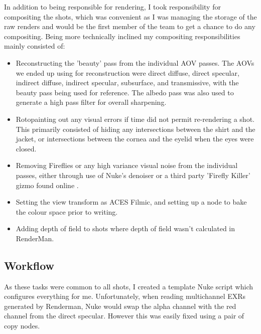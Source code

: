 \documentclass[11pt]{article}
\begin{document}
In addition to being responsible for rendering, I took responsibility for compositing the shots, which was convenient as I was managing the storage of the raw renders and would be the first member of the team to get a chance to do any compositing. Being more technically inclined my compositing responsibilities mainly consisted of:

\begin{itemize}

\item Reconstructing the 'beauty' pass from the individual AOV passes. The AOVs we ended up using for reconstruction were direct diffuse, direct specular, indirect diffuse, indirect specular, subsurface, and transmissive, with the beauty pass being used for reference. The albedo pass was also used to generate a high pass filter for overall sharpening.

\item Rotopainting out any visual errors if time did not permit re-rendering a shot. This primarily consisted of hiding any intersections between the shirt and the jacket, or intersections between the cornea and the eyelid when the eyes were closed.

\item Removing Fireflies or any high variance visual noise from the individual passes, either through use of Nuke's denoiser or a third party 'Firefly Killer' gizmo found online \cite{muller_2015}.

\item Setting the view transform as ACES Filmic, and setting up a node to bake the colour space prior to writing.

\item Adding depth of field to shots where depth of field wasn't calculated in RenderMan.

\end{itemize}

\subsection{Workflow}

As these tasks were common to all shots, I created a template Nuke script which configures everything for me. Unfortunately, when reading multichannel EXRs generated by Renderman, Nuke would swap the alpha channel with the red channel from the direct specular. However this was easily fixed using a pair of copy nodes.
\end{document}

